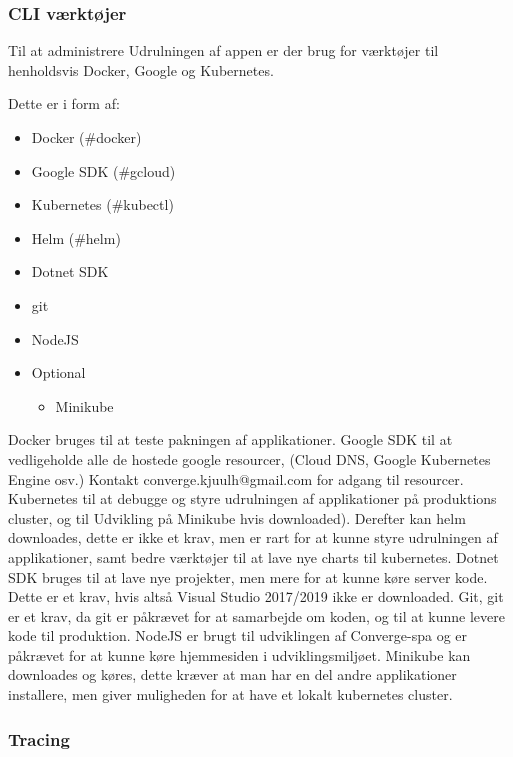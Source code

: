 \subsubsection{CLI værktøjer}

Til at administrere Udrulningen af appen er der brug for værktøjer til henholdsvis Docker, Google og Kubernetes.

Dette er i form af:

\begin{itemize}
    \item Docker (#docker)
    \item Google SDK (#gcloud)
    \item Kubernetes (#kubectl)
    \item Helm (#helm)
    \item Dotnet SDK
    \item git
    \item NodeJS
    \item Optional
    \begin{itemize}
        \item Minikube
    \end{itemize}
\end{itemize}

Docker bruges til at teste pakningen af applikationer. Google SDK til at vedligeholde alle de hostede google resourcer, (Cloud DNS, Google Kubernetes Engine osv.) Kontakt converge.kjuulh@gmail.com for adgang til resourcer. Kubernetes til at debugge og styre udrulningen af applikationer på produktions cluster, og til Udvikling på Minikube hvis downloaded). Derefter kan helm downloades, dette er ikke et krav, men er rart for at kunne styre udrulningen af applikationer, samt bedre værktøjer til at lave nye charts til kubernetes. Dotnet SDK bruges til at lave nye projekter, men mere for at kunne køre server kode. Dette er et krav, hvis altså Visual Studio 2017/2019 ikke er downloaded. Git, git er et krav, da git er påkrævet for at samarbejde om koden, og til at kunne levere kode til produktion. NodeJS er brugt til udviklingen af Converge-spa og er påkrævet for at kunne køre hjemmesiden i udviklingsmiljøet. Minikube kan downloades og køres, dette kræver at man har en del andre applikationer installere, men giver muligheden for at have et lokalt kubernetes cluster.

\subsubsection{Tracing}

